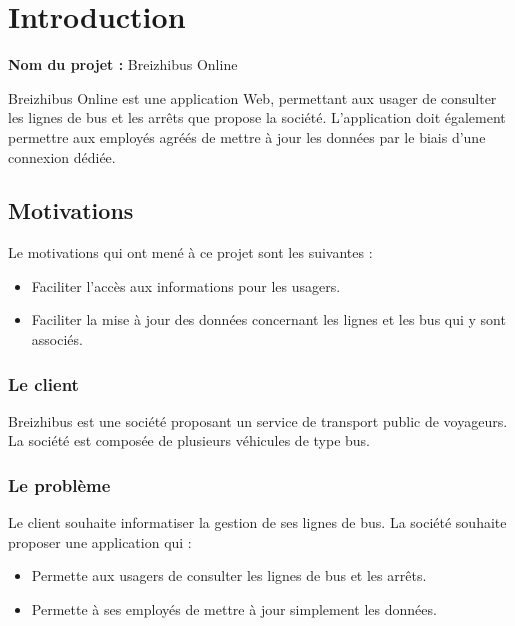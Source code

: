 \documentclass[french]{article}
\begin{document}
\newpage

\tableofcontents

\newpage

\section{Introduction}

\textbf{Nom du projet :} Breizhibus Online

Breizhibus Online est une application Web, permettant aux usager de consulter les lignes de bus et les arrêts que propose la société. L'application doit également permettre aux employés agréés de mettre à jour les données par le biais d'une connexion dédiée.

\subsection{Motivations}

Le motivations qui ont mené à ce projet sont les suivantes :

\begin{itemize}
    \item Faciliter l'accès aux informations pour les usagers.
    \item Faciliter la mise à jour des données concernant les lignes et les bus qui y sont associés.
\end{itemize}

\subsubsection{Le client}

Breizhibus est une société proposant un service de transport public de voyageurs. La société est composée de plusieurs véhicules de type bus.

\subsubsection{Le problème}

Le client souhaite informatiser la gestion de ses lignes de bus. La société souhaite proposer une application qui :
\begin{itemize}
    \item Permette aux usagers de consulter les lignes de bus et les arrêts.
    \item Permette à ses employés de mettre à jour simplement les données.
\end{itemize}
\end{document}
